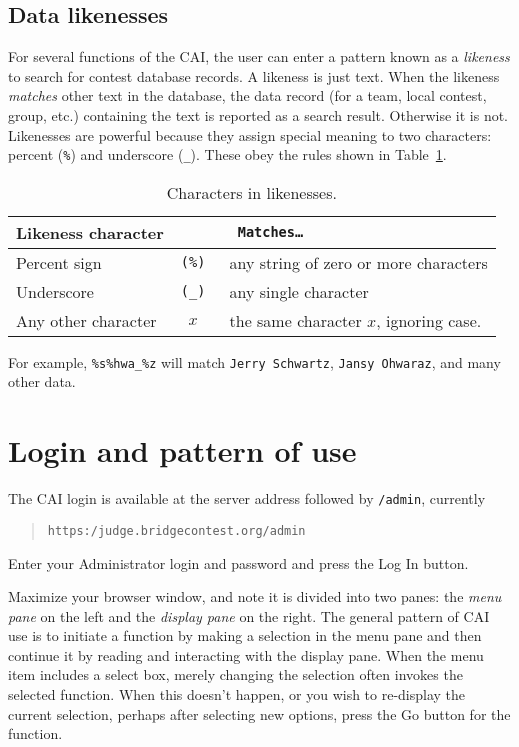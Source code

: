 \documentclass[11pt,letterpaper]{refart}
\def\nada{\hspace{0pt}}
\def\ui#1{\textsf{#1}}
\begin{document}
\subsection{Data likenesses}
For several functions of the CAI, the user can enter a pattern known as a \emph{likeness}
to search for contest database records. A likeness is just text. When the likeness
\emph{matches} other text in the database, the data record (for a team, local contest,
group, etc.) containing the text is reported as a search result. Otherwise it is not. 
Likenesses are powerful because they assign special meaning to two characters:
percent (\texttt{\%}) and underscore (\texttt{\_}). These obey the rules shown in
Table~\ref{tbl:likeness}.\
\begin{table}
\centering
\caption{Characters in likenesses.}
\begin{tabular}{l>{\tt}cl}
\multicolumn{2}{l}{\bfseries Likeness character} & {\bfseries Matches\ldots} \\ \hline
Percent sign & (\texttt{\%}\nada) & any string of zero or more characters \\
Underscore  & (\texttt{\_}\nada)  & any single character \\
Any other character & $x$ & the same character $x$, ignoring case.
\end{tabular}
\label{tbl:likeness}
\end{table}

For example, \texttt{\%s\%hwa\_\%z} will match \texttt{Jerry Schwartz},
\texttt{Jansy Ohwaraz}, and many other data.

\section{Login and pattern of use}
The CAI login is available at the server address followed by \texttt{/admin}, currently
\begin{quote} 
\texttt{https:/judge.bridgecontest.org/admin}
\end{quote}
Enter your Administrator login and password and press the \ui{Log In} button.

Maximize your browser window, and note it is divided into two panes: the \emph{menu pane}
on the left and the \emph{display pane} on the right. The general pattern of CAI use is
to initiate a function by making a selection in the menu pane and then continue it
by reading and interacting with the display pane. When the menu item includes
a select box, merely changing the selection often invokes the selected function.
When this doesn't happen, or you wish to re-display the current selection, perhaps 
after selecting new options, press the  \ui{Go} button for the function.
\end{document}
